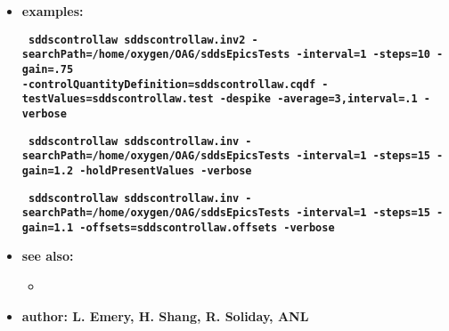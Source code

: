 \begin{itemize}
\item {\bf examples:}
     \begin{flushleft}{\tt \bf
        sddscontrollaw sddscontrollaw.inv2 -searchPath=/home/oxygen/OAG/sddsEpicsTests -interval=1 -steps=10 -gain=.75 \\
         -controlQuantityDefinition=sddscontrollaw.cqdf -testValues=sddscontrollaw.test -despike -average=3,interval=.1 -verbose
     }\end{flushleft}

      \begin{flushleft}{\tt \bf
     sddscontrollaw sddscontrollaw.inv -searchPath=/home/oxygen/OAG/sddsEpicsTests  -interval=1 -steps=15 -gain=1.2 -holdPresentValues -verbose
      }\end{flushleft}

     \begin{flushleft}{\tt \bf
     sddscontrollaw sddscontrollaw.inv -searchPath=/home/oxygen/OAG/sddsEpicsTests  -interval=1 -steps=15 -gain=1.1 -offsets=sddscontrollaw.offsets -verbose
     }\end{flushleft}
        
\item {\bf see also:}
 
%
%    
    \begin{itemize}
    \item {}
    \end{itemize}
%
%
\item {\bf author: L. Emery, H. Shang, R. Soliday, ANL}
\end{itemize}
